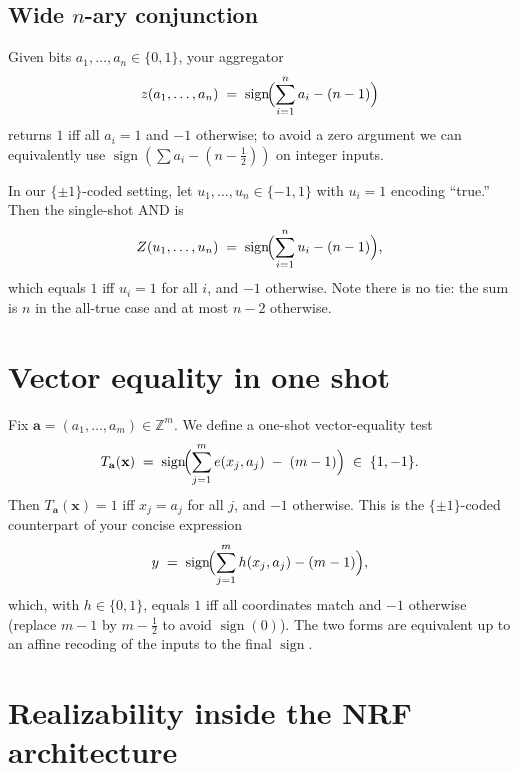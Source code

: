 \documentclass{article}
\newcommand{\sign}{\operatorname{sign}}
\newcommand{\ZZ}{\mathbb{Z}}
\begin{document}
\subsection*{Wide $n$-ary conjunction}

\begin{flushleft}
Given bits $a_1,\dots,a_n\in\{0,1\}$, your aggregator
\[
z(a_1,\dots,a_n)\;=\;\sign\!\Bigl(\sum_{i=1}^n a_i - (n-1)\Bigr)
\]
returns $1$ iff all $a_i=1$ and $-1$ otherwise; to avoid a zero argument we can equivalently use $\sign(\sum a_i - (n-\tfrac12))$ on integer inputs.

In our $\{\pm1\}$-coded setting, let $u_1,\dots,u_n\in\{-1,1\}$ with $u_i=1$ encoding “true.” Then the single-shot AND is
\[
Z(u_1,\dots,u_n)\;=\;\sign\!\Bigl(\sum_{i=1}^n u_i - (n-1)\Bigr),
\]
which equals $1$ iff $u_i=1$ for all $i$, and $-1$ otherwise. Note there is no tie: the sum is $n$ in the all-true case and at most $n-2$ otherwise.
\end{flushleft}

\section{Vector equality in one shot}

\begin{flushleft}
Fix $\mathbf{a}=(a_1,\dots,a_m)\in\ZZ^m$. We define a one-shot vector-equality test
\[
T_{\mathbf{a}}(\mathbf{x})\;=\;\sign\!\Bigl(\sum_{j=1}^m e(x_j,a_j)\;-\;(m-1)\Bigr)\;\in\;\{1,-1\}.
\]
Then $T_{\mathbf{a}}(\mathbf{x})=1$ iff $x_j=a_j$ for all $j$, and $-1$ otherwise. This is the $\{\pm1\}$-coded counterpart of your concise expression
\[
y\;=\;\sign\!\Bigl(\sum_{j=1}^m h(x_j,a_j)-(m-1)\Bigr),
\]
which, with $h\in\{0,1\}$, equals $1$ iff all coordinates match and $-1$ otherwise (replace $m-1$ by $m-\tfrac12$ to avoid $\sign(0)$). The two forms are equivalent up to an affine recoding of the inputs to the final $\sign$.
\end{flushleft}

\section{Realizability inside the NRF architecture}
\end{document}
